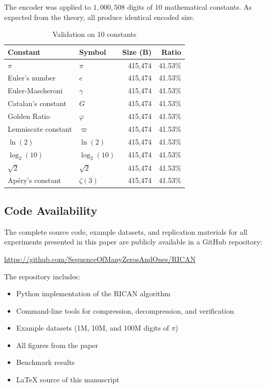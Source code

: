 \documentclass[10pt, conference]{IEEEtran}
\begin{document}
The encoder was applied to $1,000,508$ digits of 10 mathematical constants. As expected from the theory, all produce identical encoded size.

\begin{table}[ht]
\centering
\caption{Validation on 10 constants}
\label{tab:constants}
\begin{tabular}{llrr}
\toprule
Constant & Symbol & Size (B) & Ratio \\
\midrule
$\pi$ & $\pi$ & 415,474 & 41.53\% \\
Euler's number & $e$ & 415,474 & 41.53\% \\
Euler-Mascheroni & $\gamma$ & 415,474 & 41.53\% \\
Catalan's constant & $G$ & 415,474 & 41.53\% \\
Golden Ratio & $\varphi$ & 415,474 & 41.53\% \\
Lemniscate constant & $\varpi$ & 415,474 & 41.53\% \\
$\ln(2)$ & $\ln(2)$ & 415,474 & 41.53\% \\
$\log_2(10)$ & $\log_2(10)$ & 415,474 & 41.53\% \\
$\sqrt{2}$ & $\sqrt{2}$ & 415,474 & 41.53\% \\
Ap\'ery's constant & $\zeta(3)$ & 415,474 & 41.53\% \\
\bottomrule
\end{tabular}
\end{table}

\subsection{Code Availability}

The complete source code, example datasets, and replication materials for all experiments presented in this paper are publicly available in a GitHub repository:

\begin{center}
\url{https://github.com/SequenceOfManyZerosAndOnes/RICAN}
\end{center}

The repository includes:
\begin{itemize}
    \item Python implementation of the RICAN algorithm
    \item Command-line tools for compression, decompression, and verification
    \item Example datasets (1M, 10M, and 100M digits of $\pi$)
    \item All figures from the paper
    \item Benchmark results
    \item LaTeX source of this manuscript
\end{itemize}
\end{document}
